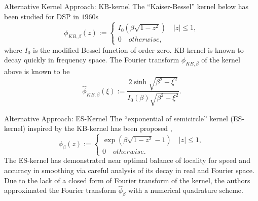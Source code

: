\documentclass{beamer}
\begin{document}
\begin{frame}{Alternative Kernel Approach: KB-kernel}
  The ``Kaiser-Bessel'' kernel below \cite{Book-Kaiser} has been studied for DSP in $1960$s
  \begin{equation}
    \phi_{KB,\beta}(z) :=
    \begin{cases}
      I_{0}\left(\beta\sqrt{1-z^2}\right) \quad |z| \le 1,\\
      0 \quad otherwise,
    \end{cases}
    \label{eq:KB-kernel}
  \end{equation}
  where $I_{0}$ is the modified Bessel function of order zero.
  KB-kernel is known to decay quickly in frequency space.
  The Fourier transform $\phi_{KB,\beta}$ of the kernel above is known to be
  \begin{equation}
    \hat{\phi}_{KB,\beta}(\xi) :=
    \frac{2\sinh\sqrt{\beta^2-\xi^2}}{I_{0}(\beta)\sqrt{\beta^2-\xi^2}}.
    \label{eq:FT-KB-kernel}
  \end{equation}
\end{frame}

\begin{frame}{Alternative Approach: ES-Kernel}
  The ``exponential of semicircle'' kernel (ES-kernel) inspired by the KB-kernel has been proposed 
  \cite{SISC-2019-Barnett}, \cite{IEEE-2021-Barnett} 
  \begin{equation}
    \phi_{\beta}(z) :=
    \begin{cases}
      \exp\left(\beta\sqrt{1-z^2} - 1\right) \quad |z| \le 1,\\
      0 \quad otherwise.
    \end{cases}
    \label{eq:ES-kernel}
  \end{equation}
  The ES-kernel has demonstrated near optimal balance of locality for speed and accuracy in smoothing via careful analysis of its decay in real and Fourier space.
  Due to the lack of a closed form of Fourier transform of the kernel, the authors approximated the Fourier transform $\hat{\phi}_{\beta}$ with a numerical quadrature scheme.
\end{frame}
\end{document}

